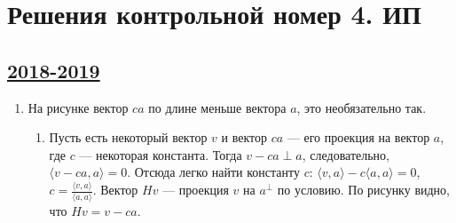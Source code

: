 \thispagestyle{empty}
\section{Решения контрольной номер 4. ИП}




\subsection[2018-2019]{\hyperref[sec:kr_04_ip_2018_2019]{2018-2019}}
\label{sec:sol_kr_04_ip_2018_2019}
\begin{enumerate}
\item
{}

На рисунке вектор $ca$ по длине меньше вектора $a$, это необязательно так.
\begin{enumerate}
	\item
	Пусть есть некоторый вектор $v$ и вектор $ca$ — его проекция на вектор $a$, где $c$ — некоторая константа. 
	Тогда $v - ca \perp a$, следовательно, $\langle v - ca, a \rangle = 0$. 
	Отсюда легко найти константу $c$: $\langle v,a \rangle - c \langle a, a \rangle = 0$, $c = \frac{\langle v,a \rangle}{\langle a,a \rangle}$. 
	Вектор $Hv$ — проекция $v$ на $a^{\perp}$ по условию. По рисунку видно, что $Hv = v - ca$.
	

\end{enumerate}
\end{enumerate}
